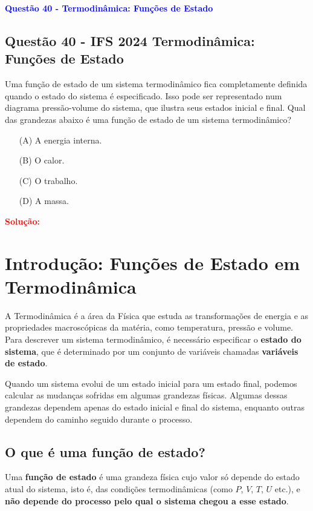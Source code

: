 \begin{flushleft}
\textbf{\textcolor{blue}{\Large Quest\~ao 40 - Termodinâmica: Funções de Estado}}\\
\noindent
\subsection{Quest\~ao 40 - IFS 2024 Termodinâmica: Funções de Estado}
Uma função de estado de um sistema termodinâmico fica
completamente definida quando o estado do sistema é
especificado. Isso pode ser representado num diagrama
pressão-volume do sistema, que ilustra seus estados inicial
e final. Qual das grandezas abaixo é uma função de estado
de um sistema termodinâmico?

\begin{itemize}
\item[(A)] A energia interna.
\item[(B)] O calor.
\item[(C)] O trabalho.
\item[(D)] A massa.
\end{itemize}

\vspace{0.5cm}

\textcolor{red}{\textbf{Solução:}}\\

\section*{Introdução: Funções de Estado em Termodinâmica}

A Termodinâmica é a área da Física que estuda as transformações de energia e as propriedades macroscópicas da matéria, como temperatura, pressão e volume. Para descrever um sistema termodinâmico, é necessário especificar o \textbf{estado do sistema}, que é determinado por um conjunto de variáveis chamadas \textbf{variáveis de estado}.

Quando um sistema evolui de um estado inicial para um estado final, podemos calcular as mudanças sofridas em algumas grandezas físicas. Algumas dessas grandezas dependem apenas do estado inicial e final do sistema, enquanto outras dependem do caminho seguido durante o processo.

\subsection*{O que é uma função de estado?}

Uma \textbf{função de estado} é uma grandeza física cujo valor só depende do estado atual do sistema, isto é, das condições termodinâmicas (como \(P\), \(V\), \(T\), \(U\) etc.), e \textbf{não depende do processo pelo qual o sistema chegou a esse estado}.


\end{flushleft}

